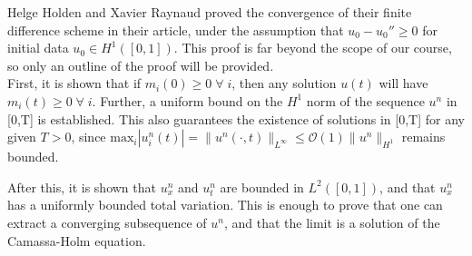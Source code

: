 Helge Holden and Xavier Raynaud proved the convergence of their finite difference scheme in their article, under the assumption that $u_{0} - u_{0}'' \geq 0$ for initial data $u_{0} \in H^{1}([0,1])$. This proof is far beyond the scope of our course, so only an outline of the proof will be provided. \\

First, it is shown that if $m_{i}(0) \geq 0 \; \forall \;i$, then any solution $u(t)$ will have $m_{i}(t) \geq 0 \; \forall \;i $. Further, a uniform bound on the $H^{1}$ norm of the sequence $u^{n}$ in [0,T] is established. This also guarantees the existence of solutions in [0,T] for any given $T > 0$, since $\text{max}_{i}|u_{i}^{n}(t)| = \|u^{n}(\cdot,t)\|_{L^{\infty}} \leq \mathcal{O}(1) \|u^{n}\|_{H^{1}}$ remains bounded.

After this, it is shown that $u_{x}^{n}$ and $u_{t}^{n}$ are bounded in $L^{2}([0,1])$, and that $u_{x}^{n}$ has a uniformly bounded total variation. This is enough to prove that one can extract a converging subsequence of $u^{n}$, and that the limit is a solution of the Camassa-Holm equation. 